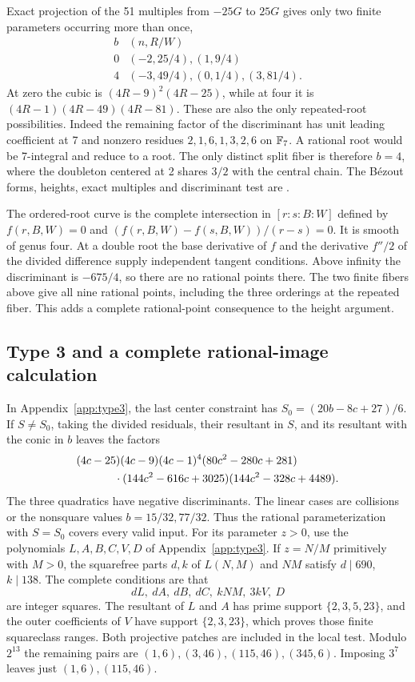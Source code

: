 Exact projection of the 51 multiples from $-25G$ to $25G$ gives
only two finite parameters occurring more than once,
\[
\begin{array}{c|l}
 b& (n,R/W)\\ \hline
0&(-2,25/4),(1,9/4)\\
4&(-3,49/4),(0,1/4),(3,81/4).
\end{array}
\]
At zero the cubic is $(4R-9)^2(4R-25)$, while at four it is
$(4R-1)(4R-49)(4R-81)$. These are also the only repeated-root
possibilities. Indeed the remaining factor of the discriminant has
unit leading coefficient at 7 and nonzero residues
$2,1,6,1,3,2,6$ on $\mathbb F_7$. A rational root would be
7-integral and reduce to a root. The only distinct split fiber is
therefore $b=4$, where the doubleton centered at 2 shares $3/2$
with the central chain. The Bézout forms, heights, exact multiples
and discriminant test are .

The ordered-root curve is the complete intersection in
$[r:s:B:W]$ defined by $f(r,B,W)=0$ and
$(f(r,B,W)-f(s,B,W))/(r-s)=0$. It is smooth of genus four.
At a double root the base derivative of $f$ and the derivative
$f''/2$ of the divided difference supply independent tangent
conditions. Above infinity the discriminant is $-675/4$, so there
are no rational points there. The two finite fibers above give all
nine rational points, including the three orderings at the repeated
fiber. This adds a complete rational-point consequence to the
height argument.

\subsection{Type 3 and a complete rational-image calculation}\label{app:type3-details}

In Appendix~\ref{app:type3}, the last center constraint has
$S_0=(20b-8c+27)/6$. If $S\ne S_0$, taking the divided residuals,
their resultant in $S$, and its resultant with the conic in $b$
leaves the factors
\[
\begin{split}
 &(4c-25)(4c-9)(4c-1)^4(80c^2-280c+281)\\
 &\hspace{12mm}\cdot(144c^2-616c+3025)(144c^2-328c+4489).
\end{split}
\]
The three quadratics have negative discriminants. The linear cases
are collisions or the nonsquare values $b=15/32,77/32$. Thus the
rational parameterization with $S=S_0$ covers every valid input.
For its parameter $z>0$, use the polynomials $L,A,B,C,V,D$ of
Appendix~\ref{app:type3}. If $z=N/M$ primitively with $M>0$, the
squarefree parts $d,k$ of $L(N,M)$ and $NM$ satisfy
$d\mid690$, $k\mid138$. The complete conditions are that
\[
 dL,\ dA,\ dB,\ dC,\ kNM,\ 3kV,\ D
\]
are integer squares. The resultant of $L$ and $A$ has prime support
$\{2,3,5,23\}$, and the outer coefficients of $V$ have support
$\{2,3,23\}$, which proves those finite squareclass ranges.
Both projective patches are included in the local test. Modulo
$2^{13}$ the remaining pairs are
$(1,6),(3,46),(115,46),(345,6)$. Imposing $3^7$ leaves just
$(1,6),(115,46)$.

